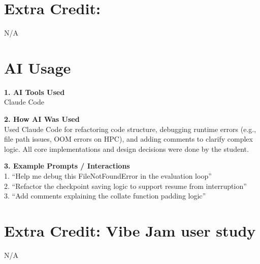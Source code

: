 \documentclass{article}
\begin{document}
\section*{Extra Credit: }
N/A



\section*{AI Usage}


\noindent\textbf{1. AI Tools Used} \\
Claude Code \\
\hrulefill



\noindent\textbf{2. How AI Was Used} \\
Used Claude Code for refactoring code structure, debugging runtime errors (e.g., file path issues, OOM errors on HPC), and adding comments to clarify complex logic. All core implementations and design decisions were done by the student. \\
\hrulefill


\noindent\textbf{3. Example Prompts / Interactions} \\
1. ``Help me debug this FileNotFoundError in the evaluation loop'' \\
2. ``Refactor the checkpoint saving logic to support resume from interruption'' \\
3. ``Add comments explaining the collate function padding logic'' \\
\hrulefill


\section*{Extra Credit: Vibe Jam user study}
N/A
\end{document}
